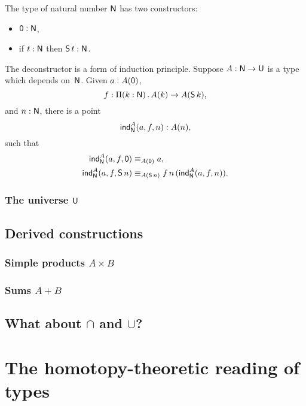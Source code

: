 \documentclass{amsart}
\begin{document}
The type of natural number $\mathsf{N}$ has two constructors:
%
\begin{itemize}
\item $\mathsf{0} : \mathsf{N}$,
\item if $t : \mathsf{N}$ then $\mathsf{S}\,t : \mathsf{N}$.
\end{itemize}
%
The deconstructor is a form of induction principle. Suppose $A : \mathsf{N} \to \mathsf{U}$
is a type which depends on~$\mathsf{N}$. Given $a : A(\mathsf{0})$,
%
\begin{equation*}
  f : \Pi(k : \mathsf{N}) \,.\, A(k) \to A(\mathsf{S}\,k),
\end{equation*}
%
and $n : \mathsf{N}$, there is a point
%
\begin{equation*}
  \mathsf{ind}_{\mathsf{N}}^A (a, f, n) : A(n),
\end{equation*}
%
such that
%
\begin{align*}
  \mathsf{ind}_{\mathsf{N}}^A (a, f, \mathsf{0}) &\equiv_{A(\mathsf{0})} a, \\
  \mathsf{ind}_{\mathsf{N}}^A (a, f, \mathsf{S}\,n) &\equiv_{A(\mathsf{S}\,n)} f \, n \, (\mathsf{ind}_{\mathsf{N}}^A (a, f, n)).
\end{align*}


\subsubsection{The universe $\mathsf{U}$}
\label{sec:universe}


\subsection{Derived constructions}

\subsubsection{Simple products $A \times B$}

\subsubsection{Sums $A + B$}

\subsection{What about $\cap$ and $\cup$?}


\section{The homotopy-theoretic reading of types}
\end{document}
